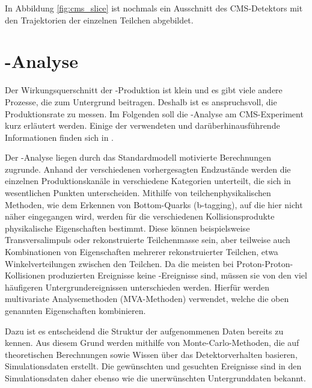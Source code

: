 In Abbildung \ref{fig:cms_slice} ist nochmals ein Ausschnitt des CMS-Detektors mit den Trajektorien der einzelnen Teilchen abgebildet.  %

\section{\ttH-Analyse}
\label{ch:Experiment:sec:ttH}

Der Wirkungsquerschnitt der \ttH-Produktion ist klein und es gibt viele andere Prozesse, die zum Untergrund beitragen. Deshalb ist es anspruchsvoll, die Produktionsrate zu messen. Im Folgenden soll die \ttH-Analyse am CMS-Experiment kurz erl\"autert werden. Einige der verwendeten und dar\"uberhinausf\"uhrende Informationen finden sich in \cite{Khachatryan:2014qaa}.

Der \ttH-Analyse liegen durch das Standardmodell motivierte Berechnungen zugrunde. Anhand der verschiedenen vorhergesagten Endzust\"ande werden die einzelnen Produktionskan\"ale in verschiedene Kategorien unterteilt, die sich in wesentlichen Punkten unterscheiden. Mithilfe von teilchenphysikalischen Methoden, wie dem Erkennen von Bottom-Quarks (b-tagging), auf die hier nicht n\"aher eingegangen wird, werden f\"ur die verschiedenen Kollisionsprodukte physikalische Eigenschaften bestimmt. Diese k\"onnen beispielsweise Transversalimpuls oder rekonstruierte Teilchenmasse sein, aber teilweise auch Kombinationen von Eigenschaften mehrerer rekonstruierter Teilchen, etwa Winkelverteilungen zwischen den Teilchen. Da die meisten bei Proton-Proton-Kollisionen produzierten Ereignisse keine \ttH-Ereignisse sind, m\"ussen sie von den viel h\"aufigeren Untergrundereignissen unterschieden werden. Hierf\"ur werden multivariate Analysemethoden (MVA-Methoden) verwendet, welche die oben genannten Eigenschaften kombinieren.

Dazu ist es entscheidend die Struktur der aufgenommenen Daten bereits zu kennen. Aus diesem Grund werden mithilfe von Monte-Carlo-Methoden, die auf theoretischen Berechnungen sowie Wissen \"uber das Detektorverhalten basieren, Simulationsdaten erstellt. Die gew\"unschten und gesuchten Ereignisse sind in den Simulationsdaten daher ebenso wie die unerw\"unschten Untergrunddaten bekannt.

